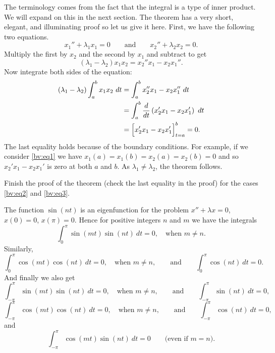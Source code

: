 The terminology comes from the fact that the integral is a type of
inner product.  We will expand on this in the next section.  The theorem
has a very short, elegant, and illuminating proof so let us give it here.
First, we have the following two equations.
\begin{equation*}
x_1'' + \lambda_1 x_1 = 0
\qquad \text{and} \qquad
x_2'' + \lambda_2 x_2 = 0.
\end{equation*}
Multiply the first by $x_2$ and the second by $x_1$ and subtract to get
\begin{equation*}
(\lambda_1 - \lambda_2) x_1 x_2 = x_2'' x_1 - x_2 x_1'' .
\end{equation*}
Now integrate both sides of the equation:
\begin{equation*}
\begin{split}
(\lambda_1 - \lambda_2) \int_a^b x_1 x_2 ~dt
& =
\int_a^b x_2'' x_1 - x_2 x_1'' ~dt \\
& =
\int_a^b \frac{d}{dt} \left( x_2' x_1 - x_2 x_1' \right) ~dt \\
& =
\Bigl[ x_2' x_1 - x_2 x_1' \Bigr]_{t=a}^b
= 0 .
\end{split}
\end{equation*}
The last equality holds because of the boundary conditions.  For example, if
we consider \eqref{bv:eq1} we have $x_1(a) = x_1(b) = x_2(a) = x_2(b) = 0$
and so $x_2' x_1 - x_2 x_1'$ is zero at both $a$ and $b$.
As $\lambda_1 \not= \lambda_2$, the theorem follows.

\begin{exercise}[easy]
Finish the proof of the theorem (check the last equality in the proof) for the cases
\eqref{bv:eq2} and \eqref{bv:eq3}.
\end{exercise}

The function $\sin (n t)$ is an eigenfunction for the problem
$x''+\lambda x = 0$, $x(0) = 0$, $x(\pi) = 0$. 
Hence for positive
integers $n$ and $m$ we have the integrals
\begin{equation*}
\int_{0}^\pi \sin (mt) \sin (nt) ~dt = 0 ,
\quad
\text{when } m \not = n.
\end{equation*}
Similarly,
\begin{equation*}
\int_{0}^\pi \cos (mt) \cos (nt) ~dt = 0 ,
\quad
\text{when } m \not = n,
\qquad \text{and} \qquad
\int_{0}^\pi  \cos (nt) ~dt = 0 .
\end{equation*}
And finally we also get
\begin{equation*}
\int_{-\pi}^\pi \sin (mt) \sin (nt) ~dt = 0 ,
\quad
\text{when } m \not = n, 
\qquad \text{and} \qquad
\int_{-\pi}^\pi  \sin (nt) ~dt = 0 ,
\end{equation*}
\begin{equation*}
\int_{-\pi}^\pi \cos (mt) \cos (nt) ~dt = 0 ,
\quad
\text{when } m \not = n,
\qquad \text{and} \qquad
\int_{-\pi}^\pi  \cos (nt) ~dt = 0 ,
\end{equation*}
and
\begin{equation*}
\int_{-\pi}^\pi \cos (mt) \sin (nt) ~dt = 0 
\qquad \text{(even if $m=n$).}
\end{equation*}

